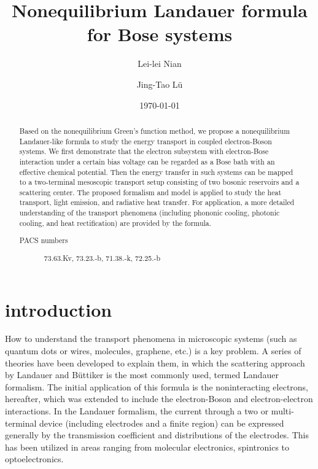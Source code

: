 \documentclass[aps
,twocolumn
,floatfix,footinbib]{revtex4-1}
\begin{document}

\title{Nonequilibrium Landauer formula for Bose systems}%

\author{Lei-lei Nian}

\author{Jing-Tao L\"{u}}


\date{\today}%
\begin{abstract}
 Based on the nonequilibrium Green’s function method, we propose a nonequilibrium Landauer-like formula to study the energy transport in coupled electron-Boson systems. We first demonstrate that the electron subsystem with electron-Bose interaction under a certain bias voltage can be regarded as a Bose bath with an effective chemical potential. Then the energy transfer in such systems can be mapped to a two-terminal mesoscopic transport setup consisting of two bosonic reservoirs and a scattering center. The proposed formalism and model is applied to study the heat transport, light emission, and radiative heat transfer.
For application, a more detailed understanding of the transport phenomena (including phononic cooling, photonic cooling, and heat rectification) are provided by the formula.

\begin{description}
\item[PACS numbers]
73.63.Kv, 73.23.-b, 71.38.-k, 72.25.-b
\end{description}
\end{abstract}


\maketitle

\section{introduction}
How to understand the transport phenomena in microscopic systems (such as quantum dots or wires, molecules, graphene, etc.) is a key problem. A series of
theories have been developed to explain them, in which the scattering approach by Landauer\cite{landauer1957spatial} and B\"{u}ttiker\cite{buttiker1986four} is the most commonly used, termed Landauer formalism. The initial application of this formula is the noninteracting electrons, hereafter, which was extended to include the electron-Boson and electron-electron interactions\cite{meir1992landauer,jauho1994time,lu2007coupled}.
In the Landauer formalism, the current through a two or multi- terminal device (including electrodes and a finite region) can be expressed generally by the transmission coefficient and distributions of the electrodes. This has been utilized in areas ranging from molecular electronics, spintronics to optoelectronics\cite{galperin2007molecular,haug2008quantum,galperin2012molecular}.
\end{document}
